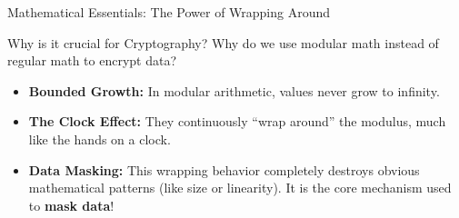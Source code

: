\documentclass[aspectratio=169, 10pt]{beamer}
\begin{document}
\begin{frame}{Mathematical Essentials: The Power of Wrapping Around}
    
    \begin{block}{Why is it crucial for Cryptography?}
        Why do we use modular math instead of regular math to encrypt data?
    \end{block}

    \vspace{0.4cm}
    \begin{itemize}
        \item \textbf{Bounded Growth:} In modular arithmetic, values never grow to infinity. 
        \vspace{0.3cm}
        \item \textbf{The Clock Effect:} They continuously ``wrap around'' the modulus, much like the hands on a clock.
        \vspace{0.3cm}
        \item \textbf{Data Masking:} This wrapping behavior completely destroys obvious mathematical patterns (like size or linearity). It is the core mechanism used to \textbf{mask data}!
    \end{itemize}
\end{frame}
\end{document}
